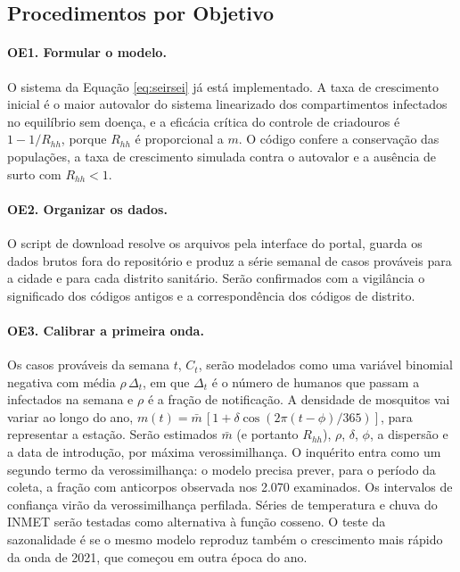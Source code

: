 \subsection{Procedimentos por Objetivo}

\paragraph{OE1. Formular o modelo.} O sistema da Equação \ref{eq:seirsei} já está implementado. A taxa de
crescimento inicial é o maior autovalor do sistema linearizado dos compartimentos infectados no
equilíbrio sem doença, e a eficácia crítica do controle de criadouros é $1 - 1/R_{hh}$, porque $R_{hh}$ é
proporcional a $m$. O código confere a conservação das populações, a taxa de crescimento simulada contra o
autovalor e a ausência de surto com $R_{hh} < 1$.

\paragraph{OE2. Organizar os dados.} O script de download resolve os arquivos pela interface do portal,
guarda os dados brutos fora do repositório e produz a série semanal de casos prováveis para a cidade e
para cada distrito sanitário. Serão confirmados com a vigilância o significado dos códigos antigos e a
correspondência dos códigos de distrito.

\paragraph{OE3. Calibrar a primeira onda.} Os casos prováveis da semana $t$, $C_t$, serão modelados como
uma variável binomial negativa com média $\rho\, \Delta_t$, em que $\Delta_t$ é o número de humanos que
passam a infectados na semana e $\rho$ é a fração de notificação. A densidade de mosquitos vai variar ao
longo do ano, $m(t) = \bar{m}\,[1 + \delta \cos(2\pi(t - \phi)/365)]$, para representar a estação. Serão
estimados $\bar{m}$ (e portanto $R_{hh}$), $\rho$, $\delta$, $\phi$, a dispersão e a data de introdução,
por máxima verossimilhança. O inquérito entra como um segundo termo da verossimilhança: o modelo precisa
prever, para o período da coleta, a fração com anticorpos observada nos 2.070 examinados. Os intervalos
de confiança virão da verossimilhança perfilada. Séries de temperatura e chuva do INMET serão testadas
como alternativa à função cosseno. O teste da sazonalidade é se o mesmo modelo reproduz também o
crescimento mais rápido da onda de 2021, que começou em outra época do ano.

